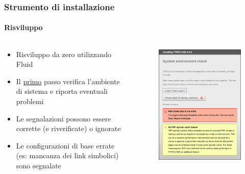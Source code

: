 \begin{frame}[fragile]
	\frametitle{Strumento di installazione}
	\framesubtitle{Risviluppo}

	\begin{columns}[T]

		\begin{column}{.5\textwidth}
			\begin{itemize}
				\item Risviluppo da zero utilizzando Fluid
				\item Il \underline{primo} passo verifica l'ambiente di sistema e riporta eventuali problemi
				\item Le segnalazioni possono essere corrette (e riverificate) o ignorate
				\item Le configurazioni di base errate (es: mancanza dei link simbolici) sono segnalate
			\end{itemize}
		\end{column}

		\begin{column}{.5\textwidth}
			\begin{figure}\vspace*{-0.4cm}
				\includegraphics[width=0.8\linewidth]{Images/InstallTool/SystemEnvironmentCheck.png}
			\end{figure}
		\end{column}

	\end{columns}

\end{frame}

